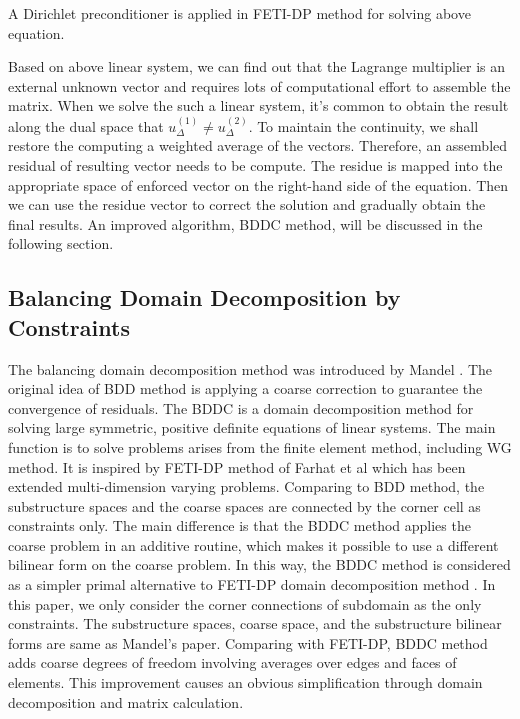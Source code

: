 A Dirichlet preconditioner is applied in FETI-DP method for solving above equation. 

Based on above linear system, we can find out that the Lagrange multiplier is an external unknown vector and requires lots of computational effort to assemble the matrix. When we solve the such a linear system, it's common to obtain the result along the dual space that $ u_{\Delta}^{(1)} \neq  u_{\Delta}^{(2)}$. To maintain the continuity, we shall restore the computing a weighted average of the vectors. Therefore, an assembled residual of resulting vector needs to be compute. The residue is mapped into the appropriate space of enforced vector on the right-hand side of the equation. Then we can use the residue vector to correct the solution and gradually obtain the final results. An improved algorithm, BDDC method, will be discussed in the following section.


\subsection{Balancing Domain Decomposition by Constraints}

The balancing domain decomposition method was introduced by Mandel \cite{mandel2005algebraic}. The original idea of BDD method is applying a coarse correction to guarantee the convergence of residuals. The BDDC is a domain decomposition method for solving large symmetric, positive definite equations of linear systems. The main function is to solve problems arises from the finite element method, including WG method. It is inspired by FETI-DP method of Farhat et al \cite{farhat1994optimal, farhat2001feti} which has been extended multi-dimension varying problems. Comparing to BDD method, the substructure spaces and the coarse spaces are connected by the corner cell as constraints only. The main difference is that the BDDC method applies the coarse problem in an additive routine, which makes it possible to use a different bilinear form on the coarse problem. In this way, the BDDC method is considered as a simpler primal alternative to FETI-DP domain decomposition method \cite{li2006feti}. In this paper, we only consider the corner connections of subdomain as the only constraints. The substructure spaces, coarse space, and the substructure bilinear forms are same as Mandel’s paper. Comparing with FETI-DP, BDDC method adds coarse degrees of freedom involving averages over edges and faces of elements. This improvement causes an obvious simplification through domain decomposition and matrix calculation.

